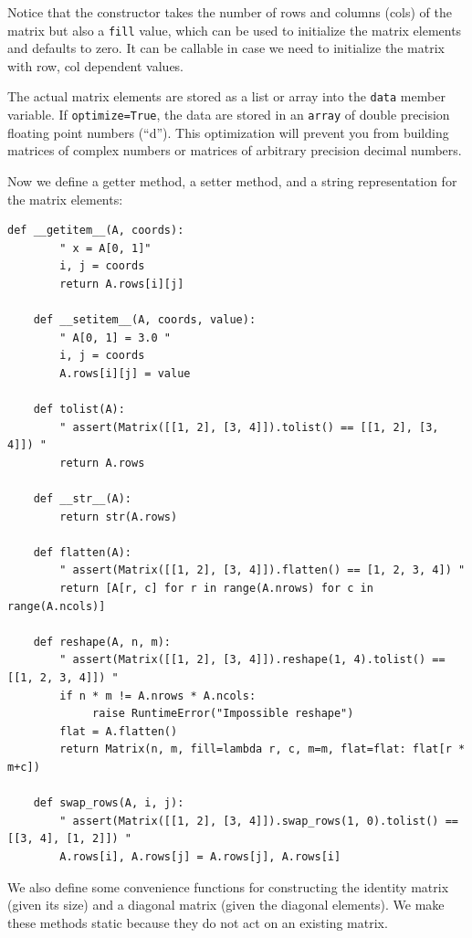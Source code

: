 \documentclass[justified, sixbynine]{tufte-book}
\def\ft{\small\tt}
\theoremstyle{plain}%
\newtheorem * {corollary}{Corollary}
\theoremstyle{definition}
\theoremstyle{remark}
\newtheorem * {remark}{Remark}
\newtheorem * {note}{Note}
\begin{document}
\begin{fullwidth}
Notice that the constructor takes the number of rows and columns (cols) of the matrix but also a {\ft fill} value, which can be used to initialize the matrix elements and defaults to zero. It can be callable in case we need to initialize the matrix with row, col dependent values.

The actual matrix elements are stored as a list or array into the {\ft data} member variable. If {\ft optimize=True}, the data are stored in an {\ft array} of double precision floating point numbers (``d''). This optimization will prevent you from building matrices of complex numbers or matrices of arbitrary precision decimal numbers.

Now we define a getter method, a setter method, and a string representation for the matrix elements:

\begin{lstlisting}[caption={in file: {\ft nlib.py}}]
    def __getitem__(A, coords):
        " x = A[0, 1]"
        i, j = coords
        return A.rows[i][j]

    def __setitem__(A, coords, value):
        " A[0, 1] = 3.0 "
        i, j = coords
        A.rows[i][j] = value

    def tolist(A):
        " assert(Matrix([[1, 2], [3, 4]]).tolist() == [[1, 2], [3, 4]]) "
        return A.rows

    def __str__(A):
        return str(A.rows)

    def flatten(A):
        " assert(Matrix([[1, 2], [3, 4]]).flatten() == [1, 2, 3, 4]) "
        return [A[r, c] for r in range(A.nrows) for c in range(A.ncols)]

    def reshape(A, n, m):
        " assert(Matrix([[1, 2], [3, 4]]).reshape(1, 4).tolist() == [[1, 2, 3, 4]]) "
        if n * m != A.nrows * A.ncols:
             raise RuntimeError("Impossible reshape")
        flat = A.flatten()
        return Matrix(n, m, fill=lambda r, c, m=m, flat=flat: flat[r * m+c])

    def swap_rows(A, i, j):
        " assert(Matrix([[1, 2], [3, 4]]).swap_rows(1, 0).tolist() == [[3, 4], [1, 2]]) "
        A.rows[i], A.rows[j] = A.rows[j], A.rows[i]
\end{lstlisting}


We also define some convenience functions for constructing the identity matrix (given its size) and a diagonal matrix (given the diagonal elements). We make these methods static because they do not act on an existing matrix.


\end{fullwidth}
\end{document}

